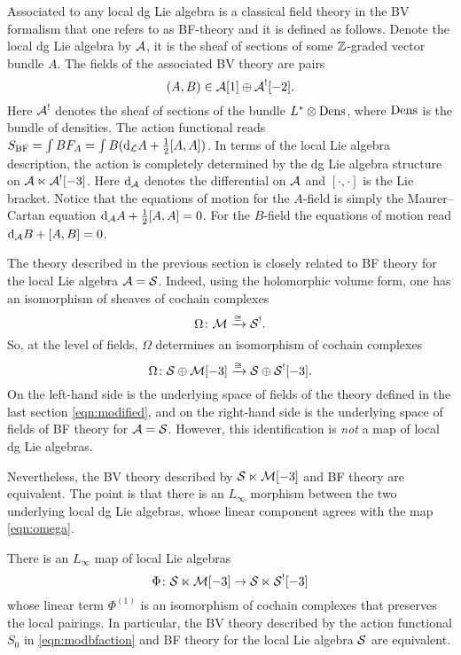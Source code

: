 \documentclass[11pt]{amsart}
\begin{document}
Associated to any local dg Lie algebra is a classical field theory in the BV formalism that one refers to as BF-theory and it is defined as follows.
Denote the local dg Lie algebra by $\mathcal A$, it is the sheaf of sections of some $\mathbb Z$-graded vector bundle $A$. 
The fields of the associated BV theory are pairs
\[
  (A, B) \in \mathcal A[1] \oplus \mathcal A^{!}[-2] .
\]
Here $\mathcal A^!$ denotes the sheaf of sections of the bundle $L^* \otimes {\rm Dens}$, where ${\rm Dens}$ is the bundle of densities. 
The action functional reads $S_{\rm BF} = \int B F_{A} = \int B ({\rm d}_{\mathcal L}A + \frac12 [A,A])$.
In terms of the local Lie algebra description, the action is completely determined by the dg Lie algebra structure on $\mathcal A \ltimes \mathcal A^![-3]$. 
Here ${\rm d}_{\mathcal A}$ denotes the differential on $\mathcal A$ and $[\cdot,\cdot]$ is the Lie bracket.
Notice that the equations of motion for the $A$-field is simply the Maurer--Cartan equation ${\rm d}_\mathcal A A + \frac12 [A,A] = 0$.
For the $B$-field the equations of motion read ${\rm d}_\mathcal A B + [A, B] = 0$.

The theory described in the previous section is closely related to BF theory for the local Lie algebra $\mathcal A = \mathcal S$. 
Indeed, using the holomorphic volume form, one has an isomorphism of sheaves of cochain complexes
\begin{equation}\label{eqn:modified}
\Omega \colon \mathcal M \xrightarrow{\cong} \mathcal S^! .
\end{equation}
So, at the level of fields, $\Omega$ determines an isomorphism of cochain complexes
\begin{equation}\label{eqn:omega}
\Omega \colon \mathcal S \oplus \mathcal M [-3] \xrightarrow{\cong} \mathcal S \oplus \mathcal S^![-3]  .
\end{equation}
On the left-hand side is the underlying space of fields of the theory defined in the last section \eqref{eqn:modified}, and on the right-hand side is the underlying space of fields of BF theory for $\mathcal A = \mathcal S$. 
However, this identification is {\em not} a map of local dg Lie algebras. 

Nevertheless, the BV theory described by $\mathcal S \ltimes \mathcal M [-3]$ and BF theory are equivalent. 
The point is that there is an $L_\infty$ morphism between the two underlying local dg Lie algebras, whose linear component agrees with the map \eqref{eqn:omega}.

\begin{prop}
There is an $L_\infty$ map of local Lie algebras
\[
\Phi \colon \mathcal S \ltimes \mathcal M[-3] \to \mathcal S \ltimes \mathcal S^! [-3]
\]
whose linear term $\Phi^{(1)}$ is an isomorphism of cochain complexes that preserves the local pairings.
In particular, the BV theory described by the action functional $S_0$ in \eqref{eqn:modbfaction} and BF theory for the local Lie algebra $\mathcal S$ are equivalent. 
\end{prop}
\end{document}
